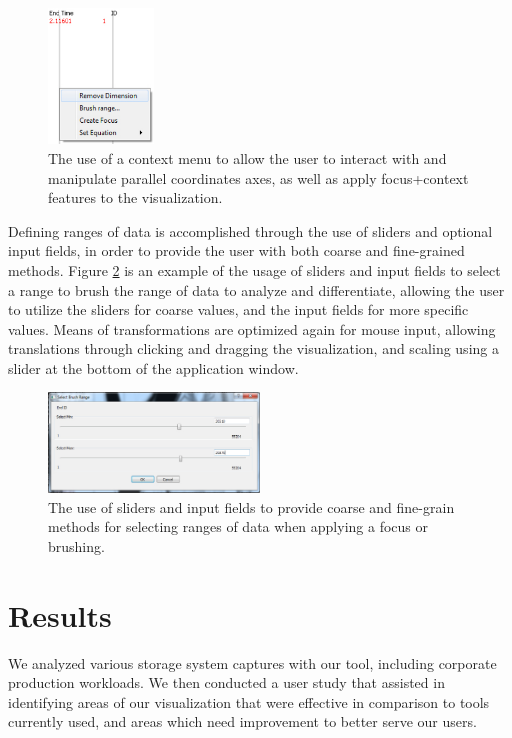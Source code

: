 \documentclass[journal]{vgtc}                %
\begin{document}
\begin{figure}[h!]
 \centering
 \includegraphics[width=0.25\textwidth]{images/context_menu.eps}
 \caption[Context menus to interact with and manipulate axes.]{The use of a context menu to allow the user to interact with and manipulate parallel coordinates axes, as well as apply focus+context features to the visualization.}
 \label{fig:context_menus}
\end{figure}

Defining ranges of data is accomplished through the use of sliders and optional input fields, in order to provide the user with both coarse and fine-grained methods. Figure \ref{fig:sliders_input} is an example of the usage of sliders and input fields to select a range to brush the range of data to analyze and differentiate, allowing the user to utilize the sliders for coarse values, and the input fields for more specific values. Means of transformations are optimized again for mouse input, allowing translations through clicking and dragging the visualization, and scaling using a slider at the bottom of the application window.

\begin{figure}[h!]
 \centering
 \includegraphics[width=0.5\textwidth]{images/select_range.eps}
 \caption[Sliders and input fields for specifying ranges of data.]{The use of sliders and input fields to provide coarse and fine-grain methods for selecting ranges of data when applying a focus or brushing.}
 \label{fig:sliders_input}
\end{figure}

\section{Results}
\label{results}
We analyzed various storage system captures with our tool, including corporate production workloads. We then conducted a user study that assisted in identifying areas of our visualization that were effective in comparison to tools currently used, and areas which need improvement to better serve our users.
\end{document}

